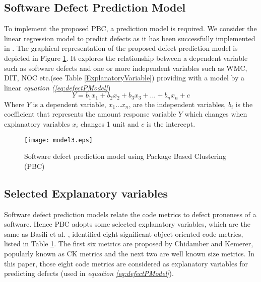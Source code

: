 \documentclass[12pt]{report}
\begin{document}
\subsection{Software Defect Prediction Model}
To implement the proposed PBC, a prediction model is required. We consider the linear regression model \cite{draper1981applied} to predict defects as it has been successfully implemented in \cite{tan2011assessing,basili1996validation}. The graphical representation of the proposed defect prediction model is depicted in {Figure \ref{defectPModel}. It explores the relationship between a dependent variable such as software defects and one or more independent variables such as WMC, DIT, NOC etc.(see Table \ref{ExplanatoryVariable}) providing with a model by a linear \textit{equation (\ref{eq:defectPModel}}) 
\begin{equation}
\label{eq:defectPModel}
 Y=b_{1}x_{1}+b_{2}x_{2}+b_{3}x_{3}+...+b_{n}x_{n}+c
\end{equation}}
Where $Y$ is a dependent variable, $x_{1}...x_{n}$, are the independent variables, $b_{i}$ is the coefficient that represents the amount response variable $Y$ which changes when explanatory variables $x_{i}$ changes 1 unit and $c$ is the intercept.

\begin{figure}[h!]
\center
      \texttt{[image: model3.eps]}
		\caption{Software defect prediction model using Package Based Clustering (PBC)}
		\label{defectPModel}	
\end{figure}



\subsection{Selected Explanatory variables}

Software defect prediction models relate the code metrics to defect proneness of a software. Hence PBC adopts some selected explanatory variables, which are the same as Basili et al. \cite{basili1996validation,di2011genetic}, identified eight significant object oriented code metrics, listed in Table \ref{defectPModel}. The first six metrics are proposed by Chidamber and Kemerer, popularly known as CK metrics \cite{chidamber1994metrics} and the next two are well known size metrics. In this paper, those eight code metrics are considered as explanatory variables for predicting defects (used in \textit{equation \ref{eq:defectPModel}}).
\end{document}
